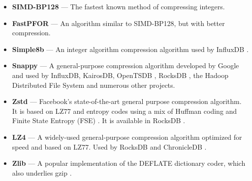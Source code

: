 \begin{itemize}[leftmargin=4mm]
\item \textbf{SIMD-BP128} \cite{fastpfor} --- The fastest known method of compressing integers.
\item \textbf{FastPFOR} \cite{fastpfor} --- An algorithm similar to SIMD-BP128, but with better compression.
\item \textbf{Simple8b} \cite{simple8b} --- An integer algorithm compression algorithm used by InfluxDB \cite{influxDB}.
\item \textbf{Snappy} \cite{snappy} --- A general-purpose compression algorithm developed by Google and used by InfluxDB, KairosDB, OpenTSDB \cite{openTSDB}, RocksDB \cite{rocksDB}, the Hadoop Distributed File System \cite{hdfs} and numerous other projects.
\item \textbf{Zstd} \cite{zstd} --- Facebook's state-of-the-art general purpose compression algorithm. It is based on LZ77 and entropy codes using a mix of Huffman coding and Finite State Entropy (FSE) \cite{fse}. It is available in RocksDB \cite{rocksDB}.
\item \textbf{LZ4} \cite{lz4} --- A widely-used general-purpose compression algorithm optimized for speed and based on LZ77. Used by RocksDB and ChronicleDB \cite{chronicleDB}.
\item \textbf{Zlib} \cite{zlib} --- A popular implementation of the DEFLATE \cite{deflate} dictionary coder, which also underlies gzip \cite{gzip}.

\end{itemize}

